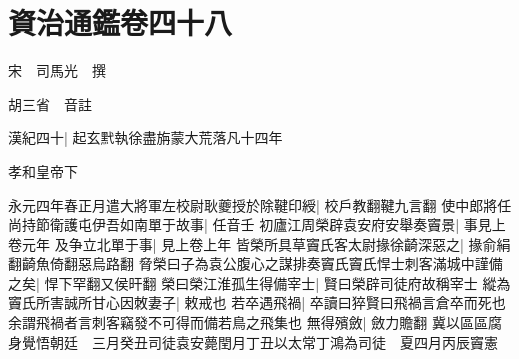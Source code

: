 \chapter{資治通鑑卷四十八}
宋　司馬光　撰

胡三省　音註

漢紀四十|{
	起玄黓執徐盡旃蒙大荒落凡十四年}


孝和皇帝下

永元四年春正月遣大將軍左校尉耿夔授於除鞬印綬|{
	校戶教翻鞬九言翻}
使中郎將任尚持節衛護屯伊吾如南單于故事|{
	任音壬}
初廬江周榮辟袁安府安舉奏竇景|{
	事見上卷元年}
及争立北單于事|{
	見上卷上年}
皆榮所具草竇氏客太尉掾徐齮深惡之|{
	掾俞絹翻齮魚倚翻惡烏路翻}
脅榮曰子為袁公腹心之謀排奏竇氏竇氏悍士刺客滿城中謹備之矣|{
	悍下罕翻又侯旰翻}
榮曰榮江淮孤生得備宰士|{
	賢曰榮辟司徒府故稱宰士}
縱為竇氏所害誠所甘心因敇妻子|{
	敕戒也}
若卒遇飛禍|{
	卒讀曰猝賢曰飛禍言倉卒而死也余謂飛禍者言刺客竊發不可得而備若鳥之飛集也}
無得殯斂|{
	斂力贍翻}
冀以區區腐身覺悟朝廷　三月癸丑司徒袁安薨閏月丁丑以太常丁鴻為司徒　夏四月丙辰竇憲

